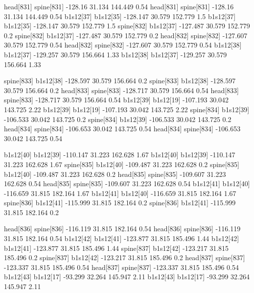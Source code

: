 head[831]    spine[831]    -128.16    31.134    144.449    0.54
head[831]    spine[831]    -128.16    31.134    144.449    0.54
b1s12[37]    b1s12[35]    -128.147    30.579    152.779    1.5
b1s12[37]    b1s12[35]    -128.147    30.579    152.779    1.5
spine[832]    b1s12[37]    -127.487    30.579    152.779    0.2
spine[832]    b1s12[37]    -127.487    30.579    152.779    0.2
head[832]    spine[832]    -127.607    30.579    152.779    0.54
head[832]    spine[832]    -127.607    30.579    152.779    0.54
b1s12[38]    b1s12[37]    -129.257    30.579    156.664    1.33
b1s12[38]    b1s12[37]    -129.257    30.579    156.664    1.33


spine[833]    b1s12[38]    -128.597    30.579    156.664    0.2
spine[833]    b1s12[38]    -128.597    30.579    156.664    0.2
head[833]    spine[833]    -128.717    30.579    156.664    0.54
head[833]    spine[833]    -128.717    30.579    156.664    0.54
b1s12[39]    b1s12[19]    -107.193    30.042    143.725    2.22
b1s12[39]    b1s12[19]    -107.193    30.042    143.725    2.22
spine[834]    b1s12[39]    -106.533    30.042    143.725    0.2
spine[834]    b1s12[39]    -106.533    30.042    143.725    0.2
head[834]    spine[834]    -106.653    30.042    143.725    0.54
head[834]    spine[834]    -106.653    30.042    143.725    0.54


b1s12[40]    b1s12[39]    -110.147    31.223    162.628    1.67
b1s12[40]    b1s12[39]    -110.147    31.223    162.628    1.67
spine[835]    b1s12[40]    -109.487    31.223    162.628    0.2
spine[835]    b1s12[40]    -109.487    31.223    162.628    0.2
head[835]    spine[835]    -109.607    31.223    162.628    0.54
head[835]    spine[835]    -109.607    31.223    162.628    0.54
b1s12[41]    b1s12[40]    -116.659    31.815    182.164    1.67
b1s12[41]    b1s12[40]    -116.659    31.815    182.164    1.67
spine[836]    b1s12[41]    -115.999    31.815    182.164    0.2
spine[836]    b1s12[41]    -115.999    31.815    182.164    0.2


head[836]    spine[836]    -116.119    31.815    182.164    0.54
head[836]    spine[836]    -116.119    31.815    182.164    0.54
b1s12[42]    b1s12[41]    -123.877    31.815    185.496    1.44
b1s12[42]    b1s12[41]    -123.877    31.815    185.496    1.44
spine[837]    b1s12[42]    -123.217    31.815    185.496    0.2
spine[837]    b1s12[42]    -123.217    31.815    185.496    0.2
head[837]    spine[837]    -123.337    31.815    185.496    0.54
head[837]    spine[837]    -123.337    31.815    185.496    0.54
b1s12[43]    b1s12[17]    -93.299    32.264    145.947    2.11
b1s12[43]    b1s12[17]    -93.299    32.264    145.947    2.11


